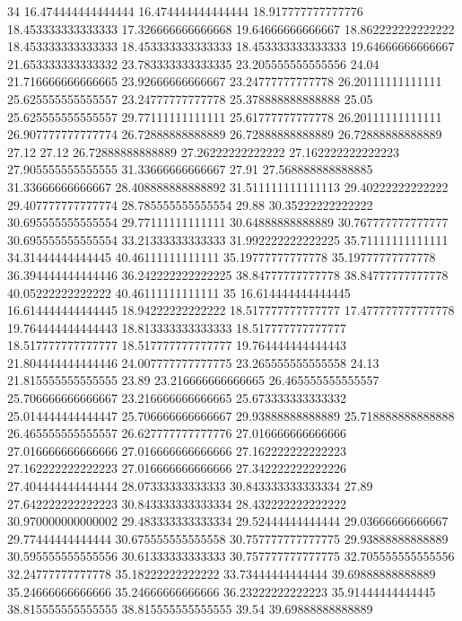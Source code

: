 34 16.474444444444444 16.474444444444444 18.917777777777776 18.453333333333333 17.326666666666668 19.64666666666667 18.862222222222222 18.453333333333333 18.453333333333333 18.453333333333333 19.64666666666667 21.653333333333332 23.783333333333335 23.205555555555556 24.04 21.716666666666665 23.92666666666667 23.24777777777778 26.20111111111111 25.625555555555557 23.24777777777778 25.378888888888888 25.05 25.625555555555557 29.77111111111111 25.61777777777778 26.20111111111111 26.907777777777774 26.72888888888889 26.72888888888889 26.72888888888889 27.12 27.12 26.72888888888889 27.26222222222222 27.162222222222223 27.905555555555555 31.33666666666667 27.91 27.568888888888885 31.33666666666667 28.408888888888892 31.511111111111113 29.40222222222222 29.407777777777774 28.785555555555554 29.88 30.35222222222222 30.695555555555554 29.77111111111111 30.64888888888889 30.767777777777777 30.695555555555554 33.21333333333333 31.992222222222225 35.71111111111111 34.31444444444445 40.46111111111111 35.19777777777778 35.19777777777778 36.394444444444446 36.242222222222225 38.84777777777778 38.84777777777778 40.05222222222222 40.46111111111111
35 16.614444444444445 16.614444444444445 18.94222222222222 18.517777777777777 17.477777777777778 19.764444444444443 18.813333333333333 18.517777777777777 18.517777777777777 18.517777777777777 19.764444444444443 21.804444444444446 24.007777777777775 23.265555555555558 24.13 21.815555555555555 23.89 23.216666666666665 26.465555555555557 25.706666666666667 23.216666666666665 25.673333333333332 25.014444444444447 25.706666666666667 29.93888888888889 25.718888888888888 26.465555555555557 26.627777777777776 27.016666666666666 27.016666666666666 27.016666666666666 27.162222222222223 27.162222222222223 27.016666666666666 27.342222222222226 27.404444444444444 28.07333333333333 30.843333333333334 27.89 27.642222222222223 30.843333333333334 28.432222222222222 30.970000000000002 29.483333333333334 29.52444444444444 29.03666666666667 29.77444444444444 30.675555555555558 30.757777777777775 29.93888888888889 30.595555555555556 30.61333333333333 30.757777777777775 32.705555555555556 32.24777777777778 35.18222222222222 33.73444444444444 39.69888888888889 35.24666666666666 35.24666666666666 36.23222222222223 35.91444444444445 38.815555555555555 38.815555555555555 39.54 39.69888888888889
